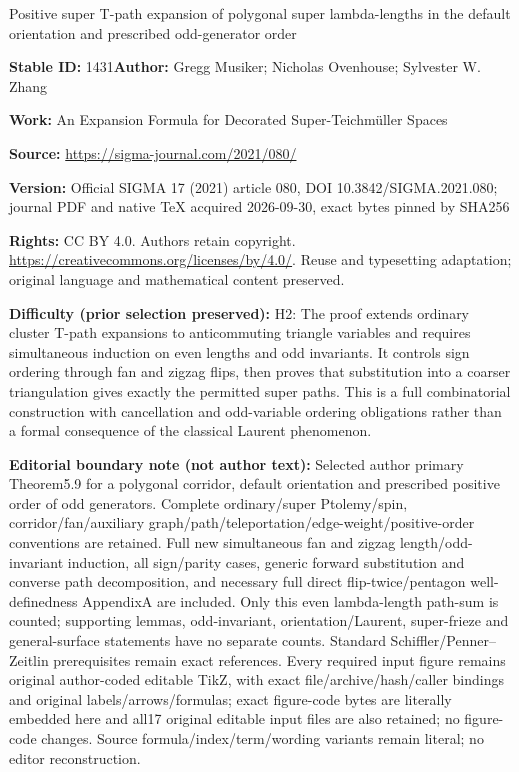 \documentclass[11pt]{article}
\numberwithin{equation}{section}
\numberwithin{equation}{section}
\begin{document}
\begin{center}\Large Positive super T-path expansion of polygonal super lambda-lengths in the default orientation and prescribed odd-generator order\end{center}
\noindent\textbf{Stable ID:} 1431\quad\textbf{Author:} Gregg Musiker; Nicholas Ovenhouse; Sylvester W. Zhang\par
\noindent\textbf{Work:} An Expansion Formula for Decorated Super-Teichmüller Spaces\par
\noindent\textbf{Source:} \url{https://sigma-journal.com/2021/080/}\par
\noindent\textbf{Version:} Official SIGMA 17 (2021) article 080, DOI 10.3842/SIGMA.2021.080; journal PDF and native TeX acquired 2026-09-30, exact bytes pinned by SHA256\par
\noindent\textbf{Rights:} CC BY 4.0. Authors retain copyright. \url{https://creativecommons.org/licenses/by/4.0/}. Reuse and typesetting adaptation; original language and mathematical content preserved.\par
\noindent\textbf{Difficulty (prior selection preserved):} {\CJKfont H2: The proof extends ordinary cluster T-path expansions to anticommuting triangle variables and requires simultaneous induction on even lengths and odd invariants. It controls sign ordering through fan and zigzag flips, then proves that substitution into a coarser triangulation gives exactly the permitted super paths. This is a full combinatorial construction with cancellation and odd-variable ordering obligations rather than a formal consequence of the classical Laurent phenomenon.}\par
\medskip\noindent\textbf{Editorial boundary note (not author text):} Selected author primary Theorem5.9 for a polygonal corridor, default orientation and prescribed positive order of odd generators. Complete ordinary/super Ptolemy/spin, corridor/fan/auxiliary graph/path/teleportation/edge-weight/positive-order conventions are retained. Full new simultaneous fan and zigzag length/odd-invariant induction, all sign/parity cases, generic forward substitution and converse path decomposition, and necessary full direct flip-twice/pentagon well-definedness AppendixA are included. Only this even lambda-length path-sum is counted; supporting lemmas, odd-invariant, orientation/Laurent, super-frieze and general-surface statements have no separate counts. Standard Schiffler/Penner–Zeitlin prerequisites remain exact references. Every required input figure remains original author-coded editable TikZ, with exact file/archive/hash/caller bindings and original labels/arrows/formulas; exact figure-code bytes are literally embedded here and all17 original editable input files are also retained; no figure-code changes. Source formula/index/term/wording variants remain literal; no editor reconstruction.\par
\end{document}
